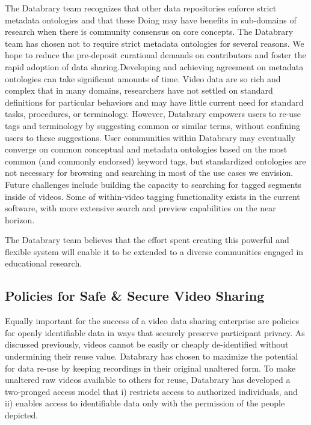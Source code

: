 \documentclass[letterpaper,man,apacite]{apa6}
\begin{document}
The Databrary team recognizes that other data repositories enforce strict metadata ontologies and that these Doing may have benefits in sub-domains of research when there is community consensus on core concepts. 
The Databrary team has chosen not to require strict metadata ontologies for several reasons. 
We hope to reduce the pre-deposit curational demands on contributors and foster the rapid adoption of data sharing.Developing and achieving agreement on metadata ontologies can take significant amounts of time. 
Video data are so rich and complex that in many domains, researchers have not settled on standard definitions for particular behaviors and may have little current need for standard tasks, procedures, or terminology. 
However, Databrary empowers users to re-use tags and terminology by suggesting common or similar terms, without confining users to these suggestions. 
User communities within Databrary may eventually converge on common conceptual and metadata ontologies based on the most common (and commonly endorsed) keyword tags, but standardized ontologies are not necessary for browsing and searching in most of the use cases we envision.
Future challenges include building the capacity to searching for tagged segments inside of videos.
Some of within-video tagging functionality exists in the current software, with more extensive search and preview capabilities on the near horizon.

The Databrary team believes that the effort spent creating this powerful and flexible system will enable it to be extended to a diverse communities engaged in educational research.

\subsection{Policies for Safe \& Secure Video Sharing}

Equally important for the success of a video data sharing enterprise are policies for openly identifiable data in ways that securely preserve participant privacy.
As discussed previously, videos cannot be easily or cheaply de-identified without undermining their reuse value.
Databrary has chosen to maximize the potential for data re-use by keeping recordings in their original
unaltered form.
To make unaltered raw videos available to others for reuse, Databrary has developed a two-pronged access model that i) restricts access to authorized individuals, and ii) enables access to identifiable data only with the permission of the people depicted.
\end{document}
